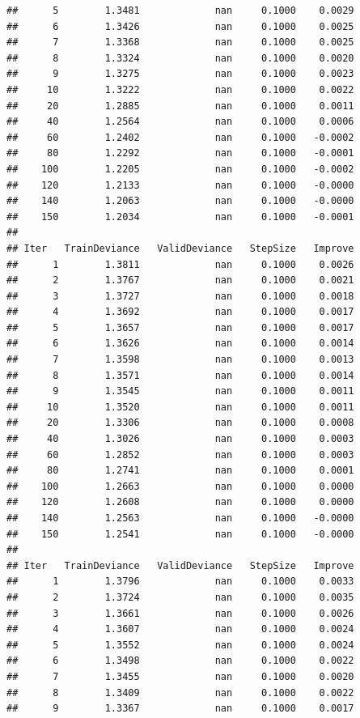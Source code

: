 \documentclass[]{article}
\begin{document}
\begin{verbatim}
##      5        1.3481             nan     0.1000    0.0029
##      6        1.3426             nan     0.1000    0.0025
##      7        1.3368             nan     0.1000    0.0025
##      8        1.3324             nan     0.1000    0.0020
##      9        1.3275             nan     0.1000    0.0023
##     10        1.3222             nan     0.1000    0.0022
##     20        1.2885             nan     0.1000    0.0011
##     40        1.2564             nan     0.1000    0.0006
##     60        1.2402             nan     0.1000   -0.0002
##     80        1.2292             nan     0.1000   -0.0001
##    100        1.2205             nan     0.1000   -0.0002
##    120        1.2133             nan     0.1000   -0.0000
##    140        1.2063             nan     0.1000   -0.0000
##    150        1.2034             nan     0.1000   -0.0001
## 
## Iter   TrainDeviance   ValidDeviance   StepSize   Improve
##      1        1.3811             nan     0.1000    0.0026
##      2        1.3767             nan     0.1000    0.0021
##      3        1.3727             nan     0.1000    0.0018
##      4        1.3692             nan     0.1000    0.0017
##      5        1.3657             nan     0.1000    0.0017
##      6        1.3626             nan     0.1000    0.0014
##      7        1.3598             nan     0.1000    0.0013
##      8        1.3571             nan     0.1000    0.0014
##      9        1.3545             nan     0.1000    0.0011
##     10        1.3520             nan     0.1000    0.0011
##     20        1.3306             nan     0.1000    0.0008
##     40        1.3026             nan     0.1000    0.0003
##     60        1.2852             nan     0.1000    0.0003
##     80        1.2741             nan     0.1000    0.0001
##    100        1.2663             nan     0.1000    0.0000
##    120        1.2608             nan     0.1000    0.0000
##    140        1.2563             nan     0.1000   -0.0000
##    150        1.2541             nan     0.1000   -0.0000
## 
## Iter   TrainDeviance   ValidDeviance   StepSize   Improve
##      1        1.3796             nan     0.1000    0.0033
##      2        1.3724             nan     0.1000    0.0035
##      3        1.3661             nan     0.1000    0.0026
##      4        1.3607             nan     0.1000    0.0024
##      5        1.3552             nan     0.1000    0.0024
##      6        1.3498             nan     0.1000    0.0022
##      7        1.3455             nan     0.1000    0.0020
##      8        1.3409             nan     0.1000    0.0022
##      9        1.3367             nan     0.1000    0.0017

\end{verbatim}
\end{document}

